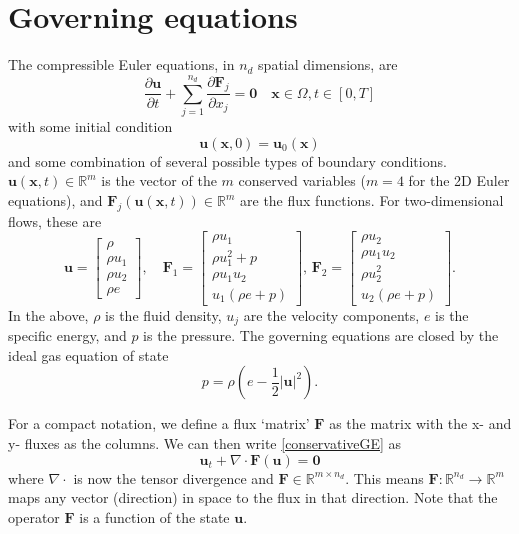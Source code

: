 \documentclass[11pt]{article}
\let\bld\boldsymbol
\begin{document}
\section{Governing equations}

The compressible Euler equations, in $n_d$ spatial dimensions, are
\begin{equation}
\frac{\partial \bld{u}}{\partial t} + \sum_{j=1}^{n_d} \frac{\partial \bld{F}_j}{\partial x_j} = \bld{0} \quad \bld{x} \in \Omega, t \in [0,T]
\label{conservativeGE}
\end{equation}
with some initial condition
\begin{equation}
\bld{u}(\bld{x},0) = \bld{u}_0(\bld{x})
\end{equation}
and some combination of several possible types of boundary conditions.
$\bld{u}(\bld{x},t) \in \mathbb{R}^m$ is the vector of the $m$ conserved variables ($m=4$ for the 2D Euler equations), and $\bld{F}_j(\bld{u}(\bld{x},t)) \in \mathbb{R}^m$ are the flux functions. For two-dimensional flows, these are
\begin{equation}
\bld{u} = 
\begin{bmatrix}
\rho \\ \rho u_1 \\ \rho u_2 \\ \rho e
\end{bmatrix}, \quad
\bld{F}_1 = 
\begin{bmatrix}
\rho u_1 \\ \rho u_1^2 + p \\ \rho u_1 u_2 \\ u_1 (\rho e + p)
\end{bmatrix}, \,
\bld{F}_2 = 
\begin{bmatrix}
\rho u_2 \\ \rho u_1 u_2 \\ \rho u_2^2 \\ u_2 (\rho e + p)
\end{bmatrix}.
\label{conservedvectors}
\end{equation}
In the above, $\rho$ is the fluid density, $u_j$ are the velocity components, $e$ is the specific energy, and $p$ is the pressure. The governing equations are closed by the ideal gas equation of state
\begin{equation}
p = \rho (e - \frac12 \vert \bld{u} \vert^2).
\label{constitutive}
\end{equation}

For a compact notation, we define a flux `matrix' $\bld{F}$ as the matrix with the x- and y- fluxes as the columns. We can then write \eqref{conservativeGE} as
\begin{equation}
\bld{u}_t + \nabla\cdot\bld{F}(\bld{u}) = \bld{0}
\label{conservativetensorGE}
\end{equation}
where $\nabla\cdot$ is now the tensor divergence and $\bld{F} \in \mathbb{R}^{m\times n_d}$. This means $\bld{F}:\mathbb{R}^{n_d}\rightarrow \mathbb{R}^m$ maps any vector (direction) in space to the flux in that direction. Note that the operator $\bld{F}$ is a function of the state $\bld{u}$.
\end{document}

